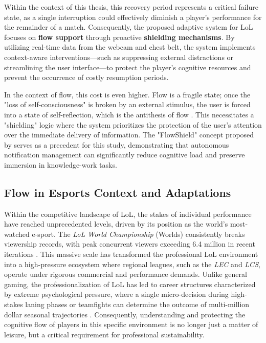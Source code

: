 Within the context of this thesis, this recovery period represents a critical failure state, as a single interruption could effectively diminish a player's performance for the remainder of a match. Consequently, the proposed adaptive system for LoL focuses on \textbf{flow support} through proactive \textbf{shielding mechanisms}. By utilizing real-time data from the webcam and chest belt, the system implements context-aware interventions—such as suppressing external distractions or streamlining the user interface—to protect the player's cognitive resources and prevent the occurrence of costly resumption periods.

In the context of flow, this cost is even higher. Flow is a fragile state; once the "loss of self-consciousness" is broken by an external stimulus, the user is forced into a state of self-reflection, which is the antithesis of flow \autocite{Moneta2012, 9296229}. This necessitates a "shielding" logic where the system prioritizes the protection of the user's attention over the immediate delivery of information. The "FlowShield" concept proposed by \textcite{ubt_eref88160} serves as a precedent for this study, demonstrating that autonomous notification management can significantly reduce cognitive load and preserve immersion in knowledge-work tasks.

\subsection{Flow in Esports Context and Adaptations}

Within the competitive landscape of LoL, the stakes of individual performance have reached unprecedented levels, driven by its position as the world's most-watched e-sport. The \textit{LoL World Championship} (Worlds) consistently breaks viewership records, with peak concurrent viewers exceeding 6.4 million in recent iterations \autocite{escharts2024, newzoo2024}. This massive scale has transformed the professional LoL environment into a high-pressure ecosystem where regional leagues, such as the \textit{LEC} and \textit{LCS}, operate under rigorous commercial and performance demands. Unlike general gaming, the professionalization of LoL has led to career structures characterized by extreme psychological pressure, where a single micro-decision during high-stakes laning phases or teamfights can determine the outcome of multi-million dollar seasonal trajectories \autocite{poulus2021determinants, gong2020league}. Consequently, understanding and protecting the cognitive flow of players in this specific environment is no longer just a matter of leisure, but a critical requirement for professional sustainability.


